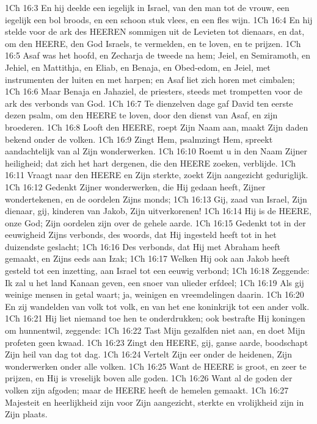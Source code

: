 1Ch 16:3  En hij deelde een iegelijk in Israel, van den man tot de vrouw, een iegelijk een bol broods, en een schoon stuk vlees, en een fles wijn.
1Ch 16:4  En hij stelde voor de ark des HEEREN sommigen uit de Levieten tot dienaars, en dat, om den HEERE, den God Israels, te vermelden, en te loven, en te prijzen.
1Ch 16:5  Asaf was het hoofd, en Zecharja de tweede na hem; Jeiel, en Semiramoth, en Jehiel, en Mattithja, en Eliab, en Benaja, en Obed-edom, en Jeiel, met instrumenten der luiten en met harpen; en Asaf liet zich horen met cimbalen;
1Ch 16:6  Maar Benaja en Jahaziel, de priesters, steeds met trompetten voor de ark des verbonds van God.
1Ch 16:7  Te dienzelven dage gaf David ten eerste dezen psalm, om den HEERE te loven, door den dienst van Asaf, en zijn broederen.
1Ch 16:8  Looft den HEERE, roept Zijn Naam aan, maakt Zijn daden bekend onder de volken.
1Ch 16:9  Zingt Hem, psalmzingt Hem, spreekt aandachtelijk van al Zijn wonderwerken.
1Ch 16:10  Roemt u in den Naam Zijner heiligheid; dat zich het hart dergenen, die den HEERE zoeken, verblijde.
1Ch 16:11  Vraagt naar den HEERE en Zijn sterkte, zoekt Zijn aangezicht geduriglijk.
1Ch 16:12  Gedenkt Zijner wonderwerken, die Hij gedaan heeft, Zijner wondertekenen, en de oordelen Zijns monds;
1Ch 16:13  Gij, zaad van Israel, Zijn dienaar, gij, kinderen van Jakob, Zijn uitverkorenen!
1Ch 16:14  Hij is de HEERE, onze God; Zijn oordelen zijn over de gehele aarde.
1Ch 16:15  Gedenkt tot in der eeuwigheid Zijns verbonds, des woords, dat Hij ingesteld heeft tot in het duizendste geslacht;
1Ch 16:16  Des verbonds, dat Hij met Abraham heeft gemaakt, en Zijns eeds aan Izak;
1Ch 16:17  Welken Hij ook aan Jakob heeft gesteld tot een inzetting, aan Israel tot een eeuwig verbond;
1Ch 16:18  Zeggende: Ik zal u het land Kanaan geven, een snoer van ulieder erfdeel;
1Ch 16:19  Als gij weinige mensen in getal waart; ja, weinigen en vreemdelingen daarin.
1Ch 16:20  En zij wandelden van volk tot volk, en van het ene koninkrijk tot een ander volk.
1Ch 16:21  Hij liet niemand toe hen te onderdrukken; ook bestrafte Hij koningen om hunnentwil, zeggende:
1Ch 16:22  Tast Mijn gezalfden niet aan, en doet Mijn profeten geen kwaad.
1Ch 16:23  Zingt den HEERE, gij, ganse aarde, boodschapt Zijn heil van dag tot dag.
1Ch 16:24  Vertelt Zijn eer onder de heidenen, Zijn wonderwerken onder alle volken.
1Ch 16:25  Want de HEERE is groot, en zeer te prijzen, en Hij is vreselijk boven alle goden.
1Ch 16:26  Want al de goden der volken zijn afgoden; maar de HEERE heeft de hemelen gemaakt.
1Ch 16:27  Majesteit en heerlijkheid zijn voor Zijn aangezicht, sterkte en vrolijkheid zijn in Zijn plaats.
